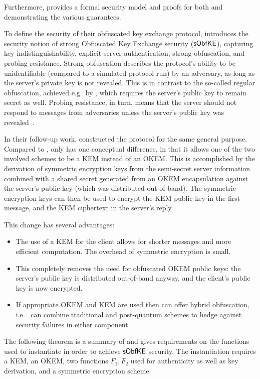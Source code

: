 Furthermore, \cite{CCS:GunSteVei24} provides a formal security model and proofs for both \obfsfour{} and \pqobfs{} demonstrating the various guarantees.

To define the security of their obfuscated key exchange protocol, \cite{CCS:GunSteVei24} introduces the security notion of strong Obfuscated Key Exchange security ($\mathsf{sObfKE}$), capturing key indistinguishability, explicit server authentication, strong obfuscation, and probing resistance.
Strong obfuscation describes the protocol's ability to be unidentifiable (compared to a simulated protocol run) by an adversary, as long as the server's private key is not revealed. This is in contrast to the so-called regular obfuscation, achieved e.g.~by \obfsfour{}, which requires the server's public key to remain secret as well.
Probing resistance, in turn, means that the server should not respond to messages from adversaries unless the server's public key was revealed~\cite[Section~4.1]{CCS:GunSteVei24}.

In their follow-up work, \cite{EPRINT:GRSV25} constructed the \drivel{} protocol for the same general purpose. Compared to \pqobfs{}, \drivel{} only has one conceptual difference, in that it allows one of the two involved schemes to be a KEM instead of an OKEM.
This is accomplished by the derivation of symmetric encryption keys from the semi-secret server information combined with a shared secret generated from an OKEM encapsulation against the server's public key (which was distributed out-of-band).
The symmetric encryption keys can then be used to encrypt the KEM public key in the first message, and the KEM ciphertext in the server's reply.

This change has several advantages:
\begin{itemize}
    \item The use of a KEM for the client allows for shorter messages and more efficient computation. The overhead of symmetric encryption is small.
    \item This completely removes the need for obfuscated OKEM public keys: the server's public key is distributed out-of-band anyway, and the client's public key is now encrypted.
    \item If appropriate OKEM and KEM are used then \drivel{} can offer hybrid obfuscation, i.e.~\drivel{} can combine traditional and post-quantum schemes to hedge against security failures in either component.
\end{itemize}

The following theorem is a summary of \cite[Theorem~5]{EPRINT:GRSV25} and gives requirements on the functions used to instantiate \drivel{} in order to achieve $\mathsf{sObfKE}$ security. The instantiation requires a KEM, an OKEM, two functions $F_1, F_2$ used for authenticity as well as key derivation, and a symmetric encryption scheme.

